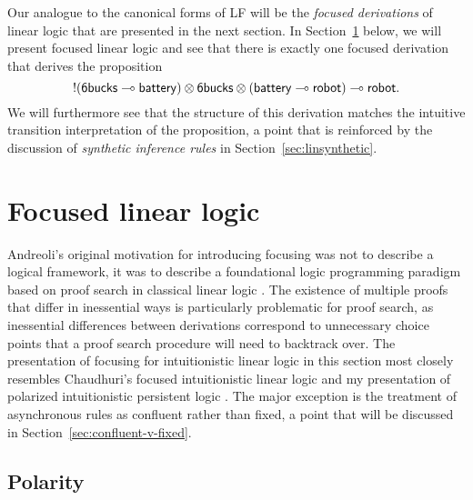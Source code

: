 Our analogue to the canonical forms of LF will be the {\it focused
  derivations} of linear logic that are presented in the next
section. In Section~\ref{sec:foclinlog} below, we will present 
focused linear logic and see that there is exactly 
one focused derivation that derives the proposition
\[{!}({\sf 6bucks} \multimap {\sf battery}) \otimes {\sf 6bucks} \otimes
({\sf battery} \multimap {\sf robot}) \multimap {\sf robot}.\] 
%
We will furthermore see that the structure of this derivation matches
the intuitive transition interpretation of the proposition, a point
that is reinforced by the discussion of {\it synthetic inference
  rules} in Section~\ref{sec:linsynthetic}. 

\section{Focused linear logic}
\label{sec:foclinlog}

Andreoli's original motivation for introducing focusing was not to
describe a logical framework, it was to describe a foundational logic
programming paradigm based on proof search in classical linear logic
\cite{andreoli92logic}. The existence of multiple proofs that differ
in inessential ways is particularly problematic for proof search, as
inessential differences between derivations correspond to unnecessary
choice points that a proof search procedure will need to backtrack
over. The presentation of focusing for intuitionistic linear logic in
this section most closely resembles Chaudhuri's focused intuitionistic
linear logic \cite{chaudhuri06focused} and my presentation of
polarized intuitionistic persistent logic
\cite{simmons11structural}. The major exception is the treatment of
asynchronous rules as confluent rather than fixed, a point that will
be discussed in Section~\ref{sec:confluent-v-fixed}.

\subsection{Polarity}
\label{sec:linpolar}

